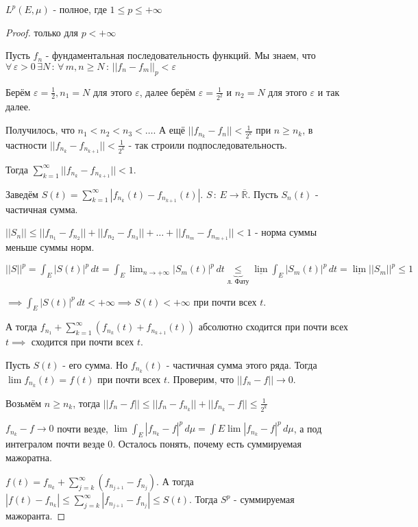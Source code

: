 \begin{theorem}
    $L^p (E, \mu)$ - полное, где $1 \leqslant p \leqslant +\infty$
\end{theorem}

\begin{proof}
    только для $p < +\infty$

    Пусть $f_n$ - фундаментальная последовательность функций. Мы знаем, что
    $\forall \, \varepsilon > 0 \, \exists N \, : \, \forall \, m, n \geqslant N \, : \, ||f_n - f_m||_p < \varepsilon$

    Берём $\varepsilon = \frac{1}{2}, n_1 = N$ для этого $\varepsilon$, далее берём $\varepsilon = \frac{1}{2^2}$ и $n_2 = N$ для этого $\varepsilon$ и так далее.

    Получилось, что $n_1 < n_2 < n_3 < \ldots$. А ещё $||f_{n_k} - f_n|| < \frac{1}{2^k}$ при $n \geqslant n_k$, в частности
    $||f_{n_k} - f_{n_{k + 1}}|| < \frac{1}{2^k}$ - так строили подпоследовательность.

    Тогда $\sum_{k = 1}^\infty ||f_{n_{k}} - f_{n_{k + 1}}|| < 1$.

    Заведём $S(t) = \sum_{k = 1}^\infty |f_{n_{k}}(t) - f_{n_{k + 1}}(t)|$. $S \, : \, E \to \overline{\mathbb{R}}$. Пусть
    $S_n(t)$ - частичная сумма.

    $||S_n|| \leqslant ||f_{n_1} - f_{n_2}|| + ||f_{n_2} - f_{n_3}|| + \ldots + ||f_{n_m} - f_{n_{m + 1}}|| < 1$ - норма суммы меньше суммы норм.

    $||S||^p = \int_{E} |S(t)|^p \, dt = \int_E \lim_{n \to +\infty} |S_m(t)|^p \, dt \underbrace{\leqslant}_{\text{л. Фату}} \underline{\lim} \int_E |S_m(t)|^p \, dt =
    \underline{\lim} ||S_m ||^p \leqslant 1 $

    $ \implies \int_E |S(t)|^p \, dt < +\infty \implies S(t) < +\infty$ при почти всех $t$.

    А тогда $f_{n_1} + \sum_{k = 1}^\infty (f_{n_k}(t) + f_{n_{k + 1}}(t))$ абсолютно сходится при почти всех $t \implies $ сходится при почти всех $t$.

    Пусть $S(t)$ - его сумма. Но $f_{n_k}(t)$ - частичная сумма этого ряда. Тогда
    $\lim f_{n_k} (t) = f(t)$ при почти всех $t$. Проверим, что $||f_n - f|| \rightarrow 0$.

    Возьмём $n \geqslant n_k$, тогда $||f_n - f|| \leqslant ||f_n - f_{n_k}|| + ||f_{n_k} - f|| \leqslant \frac{1}{2^k}$

    $f_{n_k} - f \rightarrow 0$ почти везде, $\lim \int_E |f_{n_k} - f|^p \, d\mu = \int E \lim |f_{n_k} - f|^p \, d\mu$, а под интегралом
    почти везде 0. Осталось понять, почему есть суммируемая мажоратна.

    $f(t) = f_{n_k} + \sum_{j = k}^\infty (f_{n_{j + 1}} - f_{n_j})$. А тогда $|f(t) - f_{n_k}| \leqslant \sum_{j = k}^\infty |f_{n_{j + 1}} - f_{n_j} | \leqslant S(t)$. Тогда $S^p$ - суммируемая мажоранта.
\end{proof}

